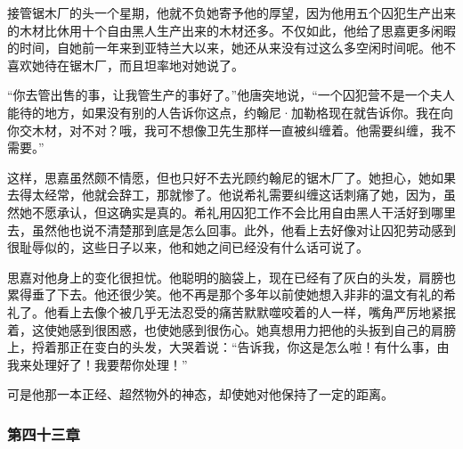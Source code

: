 \par 接管锯木厂的头一个星期，他就不负她寄予他的厚望，因为他用五个囚犯生产出来的木材比休用十个自由黑人生产出来的木材还多。不仅如此，他给了思嘉更多闲暇的时间，自她前一年来到亚特兰大以来，她还从来没有过这么多空闲时间呢。他不喜欢她待在锯木厂，而且坦率地对她说了。
\par “你去管出售的事，让我管生产的事好了。”他唐突地说，“一个囚犯营不是一个夫人能待的地方，如果没有别的人告诉你这点，约翰尼·加勒格现在就告诉你。我在向你交木材，对不对？哦，我可不想像卫先生那样一直被纠缠着。他需要纠缠，我不需要。”
\par 这样，思嘉虽然颇不情愿，但也只好不去光顾约翰尼的锯木厂了。她担心，她如果去得太经常，他就会辞工，那就惨了。他说希礼需要纠缠这话刺痛了她，因为，虽然她不愿承认，但这确实是真的。希礼用囚犯工作不会比用自由黑人干活好到哪里去，虽然他也说不清楚那到底是怎么回事。此外，他看上去好像对让囚犯劳动感到很耻辱似的，这些日子以来，他和她之间已经没有什么话可说了。
\par 思嘉对他身上的变化很担忧。他聪明的脑袋上，现在已经有了灰白的头发，肩膀也累得垂了下去。他还很少笑。他不再是那个多年以前使她想入非非的温文有礼的希礼了。他看上去像个被几乎无法忍受的痛苦默默噬咬着的人一样，嘴角严厉地紧抿着，这使她感到很困惑，也使她感到很伤心。她真想用力把他的头扳到自己的肩膀上，捋着那正在变白的头发，大哭着说：“告诉我，你这是怎么啦！有什么事，由我来处理好了！我要帮你处理！”
\par 可是他那一本正经、超然物外的神态，却使她对他保持了一定的距离。

\subsubsection{第四十三章}

